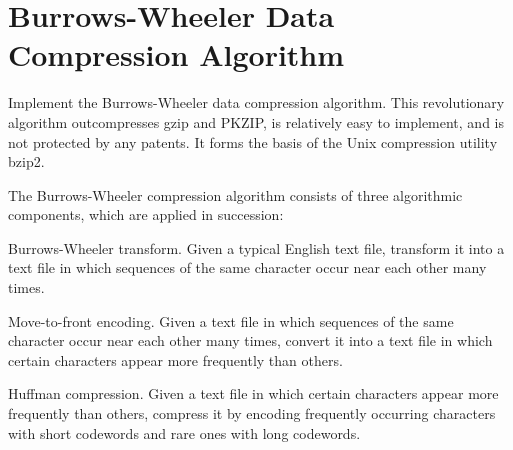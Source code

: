 \documentclass[12pt]{article}
\begin{document}

\newcommand{\hmwkClass}{COS 423}
\newcommand{\hmwkSemester}{Spring 2013}

\newcommand{\hmwkAuthorName}{Parker Watts}
\newcommand{\hmwkAuthorID}{watts}

\newcommand{\hmwkAssignmentNum}{0}

\newcommand{\hmwkProblemNum}{1}

\newcommand{\hmwkCollaborators}{Rafael Zuniga}
\thispagestyle{fancycollab}



\section{Burrows-Wheeler Data Compression Algorithm}
 Implement the Burrows-Wheeler data compression algorithm. This revolutionary algorithm outcompresses gzip and PKZIP, is relatively easy to implement, and is not protected by any patents. It forms the basis of the Unix compression utility bzip2.

The Burrows-Wheeler compression algorithm consists of three algorithmic components, which are applied in succession:

    Burrows-Wheeler transform. Given a typical English text file, transform it into a text file in which sequences of the same character occur near each other many times.

    Move-to-front encoding. Given a text file in which sequences of the same character occur near each other many times, convert it into a text file in which certain characters appear more frequently than others.

    Huffman compression. Given a text file in which certain characters appear more frequently than others, compress it by encoding frequently occurring characters with short codewords and rare ones with long codewords. 
\end{document}

